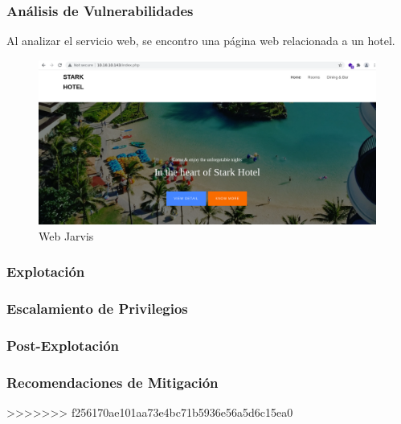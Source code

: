 \subsubsection{Análisis de Vulnerabilidades}
Al analizar el servicio web, se encontro una página web relacionada a un hotel.
\begin{figure}[H]
    \centering
    \includegraphics[width=0.99\textwidth]{imagenes/index_jarvis.png}
    \caption{Web Jarvis}
\end{figure}
\subsubsection{Explotación}
\subsubsection{Escalamiento de Privilegios}
\subsubsection{Post-Explotación}
\subsubsection{Recomendaciones de Mitigación}
>>>>>>> f256170ae101aa73e4bc71b5936e56a5d6c15ea0

